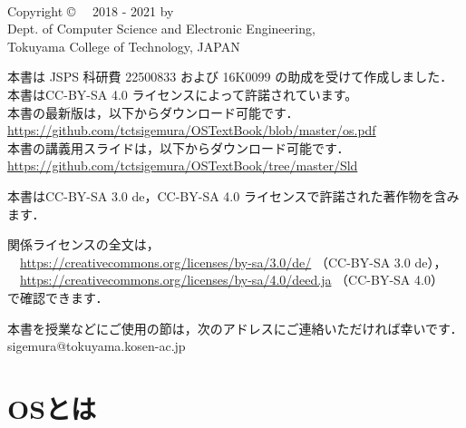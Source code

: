 \documentclass[a4paper,11pt,twocolumn]{ltjsbook}     %
\begin{document}
\thispagestyle{empty}
\onecolumn
~
\vfill
\begin{flushleft}
Copyright \copyright ~~ 2018 - 2021 by \\
Dept. of Computer Science and Electronic Engineering, \\
Tokuyama College of Technology, JAPAN
\end{flushleft}
\vspace{0.4cm}
\begin{flushleft}
本書は JSPS 科研費 22500833 および 16K0099 の助成を受けて作成しました．\\
本書はCC-BY-SA 4.0 ライセンスによって許諾されています。\\
本書の最新版は，以下からダウンロード可能です．\\
\url{https://github.com/tctsigemura/OSTextBook/blob/master/os.pdf}\\
本書の講義用スライドは，以下からダウンロード可能です．\\
\url{https://github.com/tctsigemura/OSTextBook/tree/master/Sld}
\end{flushleft}
\begin{flushleft}
本書はCC-BY-SA 3.0 de，CC-BY-SA 4.0 ライセンスで許諾された著作物を含みます．
\end{flushleft}
\begin{flushleft}
関係ライセンスの全文は，\\
　\url{https://creativecommons.org/licenses/by-sa/3.0/de/}
（CC-BY-SA 3.0 de），\\
　\url{https://creativecommons.org/licenses/by-sa/4.0/deed.ja}
（CC-BY-SA 4.0）\\
で確認できます．
\end{flushleft}
\begin{flushleft}
本書を授業などにご使用の節は，次のアドレスにご連絡いただければ幸いです．\\
sigemura@tokuyama.kosen-ac.jp
\end{flushleft}

\setcounter{tocdepth}{1}
\tableofcontents

\mainmatter

\part{OSとは}
\end{document}
